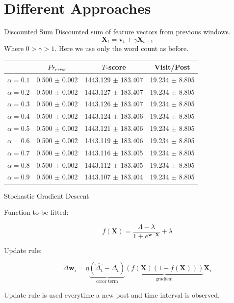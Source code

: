 \documentclass[12pt]{presentation}
\newcommand{\vocab}{\mathbf{v}}
\newcommand{\dt}{\Delta_t}
\newcommand{\fvec}{\mathbf{X}}
\newcommand{\weights}{\mathbf{w}}
\newcommand{\X}{\mathbf{X}}
\begin{document}
\section{Different Approaches}
\begin{frame}{Discounted Sum}
	Discounted sum of feature vectors from previous windows.
\[
	\fvec_t = \vocab_t + \gamma \fvec_{t-1}
\]
Where $0 > \gamma > 1$. Here we use only the word count as before.
	\begin{center}
		\footnotesize
		\begin{tabular}{ | l | c | c | c | }
			\hline
		& $Pr_{error}$		  & $T$-score			   &	Visit/Post\\
			\hline
 $\alpha=0.1$ &	0.500 $\pm$ 0.002 &	1443.129 $\pm$ 183.407 &	19.234 $\pm$ 8.805 \\
 $\alpha=0.2$ &	0.500 $\pm$ 0.002 &	1443.127 $\pm$ 183.407 &	19.234 $\pm$ 8.805 \\
 $\alpha=0.3$ &	0.500 $\pm$ 0.002 &	1443.126 $\pm$ 183.407 &	19.234 $\pm$ 8.805 \\
 $\alpha=0.4$ &	0.500 $\pm$ 0.002 &	1443.124 $\pm$ 183.406 &	19.234 $\pm$ 8.805 \\
 $\alpha=0.5$ &	0.500 $\pm$ 0.002 &	1443.121 $\pm$ 183.406 &	19.234 $\pm$ 8.805 \\
 $\alpha=0.6$ &	0.500 $\pm$ 0.002 &	1443.119 $\pm$ 183.406 &	19.234 $\pm$ 8.805 \\
 $\alpha=0.7$ &	0.500 $\pm$ 0.002 &	1443.116 $\pm$ 183.405 &	19.234 $\pm$ 8.805 \\
 $\alpha=0.8$ &	0.500 $\pm$ 0.002 &	1443.112 $\pm$ 183.405 &	19.234 $\pm$ 8.805 \\
 $\alpha=0.9$ &	0.500 $\pm$ 0.002 &	1443.107 $\pm$ 183.404 &	19.234 $\pm$ 8.805 \\
			\hline
		\end{tabular}
	\end{center}
\end{frame}
\begin{frame}{Stochastic Gradient Descent}
\begin{description}
	\item[Function to be fitted:]
\[
	f(\X) = \frac{\Lambda-\lambda}{1 + e^{\weights \cdot \X}} + \lambda
\]
\item[Update rule:]
\[
	\Delta \weights_i = \eta
				\underbrace{\left(\widehat{\dt} - \dt \right)}_{\text{error term}}
				\underbrace{\left( f(\X)(1-f(\X)) \right)}_{\text{gradient}}
						\X_i
\]
\end{description}
Update rule is used everytime a new post and time interval is observed.
\end{frame}
\end{document}
